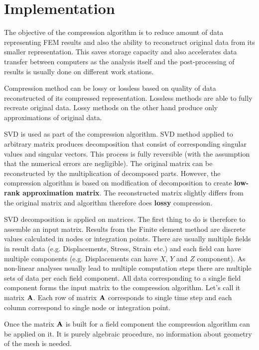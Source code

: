 \section{Implementation}
\label{sec:implementation}

The objective of the compression algorithm is to reduce amount of data representing FEM results and also the ability to reconstruct original data from its smaller representation. This saves storage capacity and also accelerates data transfer between computers as the analysis itself and the post-processing of results is usually done on different work stations.

Compression method can be lossy or lossless based on quality of data reconstructed of its compressed representation. Lossless methods are able to fully recreate original data. Lossy methods on the other hand produce only approximations of original data. 

SVD is used as part of the compression algorithm. SVD method applied to arbitrary matrix produces decomposition that consist of corresponding singular values and singular vectors. This process is fully reversible (with the assumption that the numerical errors are negligible). The original matrix can be reconstructed by the multiplication of decomposed parts. However, the compression algorithm is based on modification of decomposition to create \textbf{low-rank approximation matrix}. The reconstructed matrix slightly differs from the original matrix and algorithm therefore does \textbf{lossy} compression.

SVD decomposition is applied on matrices. The first thing to do is therefore to assemble an input matrix. Results from the Finite element method are discrete values calculated in nodes or integration points. There are usually multiple fields in result data (e.g. Displacements, Stress, Strain etc.) and each field can have multiple components (e.g. Displacements can have $X$, $Y$ and $Z$ component). As non-linear analyses usually lead to multiple computation steps there are multiple sets of data per each field component. All data corresponding to a single field component forms the input matrix to the compression algorithm. Let's call it matrix $\mathbf{A}$. Each row of matrix $\mathbf{A}$ corresponds to single time step and each column correspond to single node or integration point.

Once the matrix $\mathbf{A}$ is built for a field component the compression algorithm can be applied on it. It is purely algebraic procedure, no information about geometry of the mesh is needed. 

